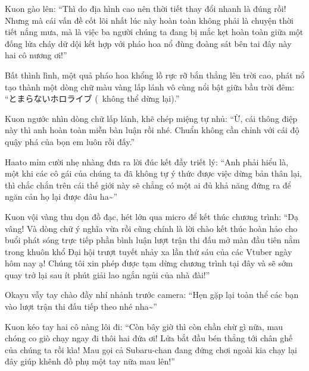 \documentclass[../main.tex]{subfiles}
\begin{document}
Kuon gào lên: ``Thì do địa hình cao nên thời tiết thay đổi nhanh là đúng rồi! Nhưng mà cái vấn đề cốt lõi nhất lúc này hoàn toàn không phải là chuyện thời tiết nắng mưa, mà là việc ba người chúng ta đang bị mắc kẹt hoàn toàn giữa một đống lửa cháy dữ dội kết hợp với pháo hoa nổ đùng đoàng sát bên tai đây này hai cô nương ơi!''

Bất thình lình, một quả pháo hoa khổng lồ rực rỡ bắn thẳng lên trời cao, phát nổ tạo thành một dòng chữ màu vàng lấp lánh vô cùng nổi bật giữa bầu trời đêm: ``とまらないホロライブ (\hll\ không thể dừng lại).''


Kuon ngước nhìn dòng chữ lấp lánh, khẽ chép miệng tự nhủ: ``Ừ, cái thông điệp này thì anh hoàn toàn miễn bàn luận rồi nhé. Chuẩn không cần chỉnh với cái độ quậy phá của bọn em luôn rồi đấy.''

Haato mỉm cười nhẹ nhàng đưa ra lời đúc kết đầy triết lý: ``Anh phải hiểu là, một khi các cô gái của chúng ta đã không tự ý thức được việc dừng bản thân lại, thì chắc chắn trên cái thế giới này sẽ chẳng có một ai đủ khả năng đứng ra để ngăn cản họ lại được đâu ha\~{}''

Kuon vội vàng thu dọn đồ đạc, hét lớn qua micro để kết thúc chương trình: ``Dạ vâng! Và dòng chữ ý nghĩa vừa rồi cũng chính là lời chào kết thúc hoàn hảo cho buổi phát sóng trực tiếp phần bình luận lượt trận thi đấu mở màn đầu tiên nằm trong khuôn khổ Đại hội trượt tuyết nhảy xa lần thứ sáu của các Vtuber ngày hôm nay ạ! Chúng tôi xin phép được tạm dừng chương trình tại đây và sẽ sớm quay trở lại sau ít phút giải lao ngắn ngủi của nhà đài!''

Okayu vẫy tay chào đầy nhí nhảnh trước camera: ``Hẹn gặp lại toàn thể các bạn vào lượt trận thi đấu tiếp theo nhé nha\~{}''

Kuon kéo tay hai cô nàng lôi đi: ``Còn bây giờ thì còn chần chừ gì nữa, mau chóng co giò chạy ngay đi thôi hai đứa ơi! Lửa bắt đầu bén thẳng tới chân ghế của chúng ta rồi kìa! Mau gọi cả Subaru-chan đang đứng chơi ngoài kia chạy lại đây giúp khênh đồ phụ một tay nữa mau lên!''
\end{document}
